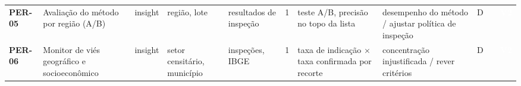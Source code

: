 {\begin{longtable}{@{}P{1.35cm}P{4.1cm}P{1.3cm}P{3.1cm}P{3.7cm}C{0.6cm}P{3.6cm}P{3.3cm}P{1.1cm}P{0.9cm}P{1.1cm}@{}}
\textbf{PER-05} & Avaliação do método por região (A/B) & insight & região, lote & resultados de inspeção & 1 & teste A/B, precisão no topo da lista & desempenho do método / ajustar política de inspeção & D &  & \colorbox{fV2}{\scriptsize \textcolor{white}{\textbf{V2}}} \\
\textbf{PER-06} & Monitor de viés geográfico e socioeconômico & insight & setor censitário, município & inspeções, IBGE & 1 & taxa de indicação $\times$ taxa confirmada por recorte & concentração injustificada / rever critérios & D &  & \colorbox{fV2}{\scriptsize \textcolor{white}{\textbf{V2}}} \\
\bottomrule
\end{longtable}}

